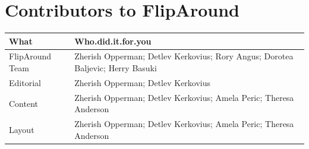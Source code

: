 \documentclass[]{book}
\theoremstyle{definition}
\theoremstyle{definition}
\theoremstyle{remark}
\begin{document}
\chapter{Contributors to FlipAround}\label{contributors-to-fliparound}

\begin{tabular}{l|l}
\hline
What & Who.did.it.for.you\\
\hline
FlipAround Team & Zherish Opperman; Detlev Kerkovius; Rory Angus; Dorotea Baljevic; Herry Basuki\\
\hline
Editorial & Zherish Opperman; Detlev Kerkovius\\
\hline
Content & Zherish Opperman; Detlev Kerkovius; Amela Peric; Theresa Anderson\\
\hline
Layout & Zherish Opperman; Detlev Kerkovius; Amela Peric; Theresa Anderson\\
\hline
\end{tabular}
\end{document}
